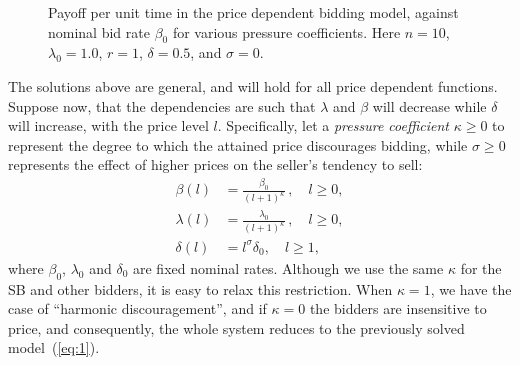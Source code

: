 \documentclass{comjnl}
\begin{document}
\begin{figure}
\centering
\caption{Payoff per unit time in the price dependent bidding
model, against nominal bid rate $\beta_0$ for various pressure
coefficients. Here $n=10$, $\lambda_0=1.0$, $r=1$, $\delta=0.5$,
and $\sigma=0$.}\label{fig:PriceDependentBid}
\end{figure}

The solutions above are general, and will hold for all price
dependent functions. Suppose now, that the dependencies are such
that $\lambda$ and $\beta$ will decrease while $\delta$ will
increase, with the price level $l$. Specifically, let a {\em
pressure coefficient} $\kappa\geq 0$ \cite{hillier64} to represent
the degree to which the attained price discourages bidding, while
$\sigma\geq 0$ represents the effect of higher prices on the
seller's tendency to sell:
\begin{align} \label{eq:PriceDependentBidding_Functions}
\beta(l) &= \frac {\beta_0}{(l+1)^{\kappa} } \,, \quad l \geq 0 , \\
\lambda(l) &= \frac{\lambda_0}{(l+1)^{\kappa}} \,, \quad l \geq 0
,\nonumber \\
\delta(l) &= l^\sigma\delta_0 , \quad l \geq 1 ,\nonumber
\end{align}
where $\beta_0$, $\lambda_0$ and $\delta_0$ are fixed nominal
rates. Although we use the same $\kappa$ for the SB and other
bidders, it is easy to relax this restriction. When $\kappa=1$, we
have the case of ``harmonic discouragement'', and if $\kappa=0$
the bidders are insensitive to price, and consequently, the whole
system reduces to the previously solved model~(\ref{eq:1}).
\end{document}

